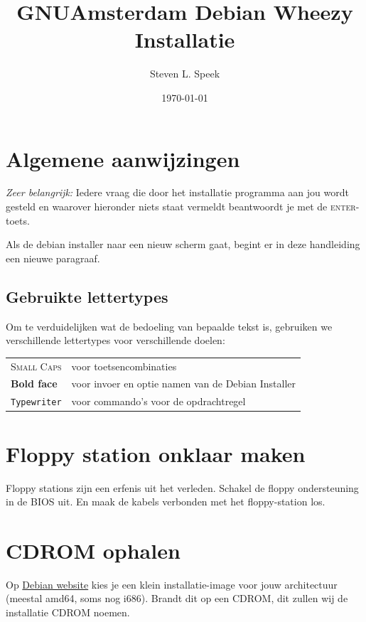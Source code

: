 \documentclass[12pt,a4paper]{article}
\begin{document}
\graphicspath{ {./images/} }
\lstset{language=bash}      
\author{Steven L. Speek}
\title{GNUAmsterdam Debian Wheezy Installatie}
\date{\today}
\maketitle
{}


\section{Algemene aanwijzingen}
\emph{Zeer belangrijk:} Iedere vraag die door het installatie programma aan jou wordt gesteld en waarover hieronder niets staat vermeldt beantwoordt je met de \textsc{enter}-toets.

Als de debian installer naar een nieuw scherm gaat, begint er in deze handleiding een nieuwe paragraaf.
\subsection{Gebruikte lettertypes}
Om te verduidelijken wat de bedoeling van bepaalde tekst is, gebruiken we verschillende lettertypes voor verschillende doelen:

\begin{tabular}{l l}
	\textsc{Small Caps} & voor toetsencombinaties \\
	\textbf{Bold face} & voor invoer en optie namen van de Debian Installer\\
	\texttt{Typewriter} & voor commando's voor de opdrachtregel\\
\end{tabular}


\section{Floppy station onklaar maken}
Floppy stations zijn een erfenis uit het verleden. Schakel de floppy ondersteuning in de BIOS uit. En maak de kabels verbonden met het floppy-station los.


\section{CDROM ophalen}
Op \href{http://www.debian.org/distrib}{Debian website} kies je een klein installatie-image voor jouw architectuur (meestal amd64, soms nog i686).
Brandt dit op een CDROM, dit zullen wij de installatie CDROM noemen.
\end{document}
